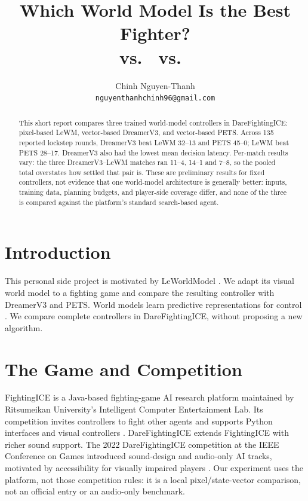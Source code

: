 \documentclass[10pt,twocolumn]{article}
\title{Which World Model Is the Best Fighter?\\
\lewm{} vs.\ \dreamer{} vs.\ \pets{}}
\author{Chinh Nguyen-Thanh\\
\texttt{nguyenthanhchinh96@gmail.com}}
\date{}
\newcommand{\system}{DareFightingICE}
\newcommand{\lewm}{LeWM}
\newcommand{\dreamer}{DreamerV3}
\newcommand{\pets}{PETS}
\begin{document}
\maketitle

\begin{abstract}
This short report compares three trained world-model controllers in
\system{}: pixel-based \lewm{}, vector-based \dreamer{}, and vector-based
\pets{}.  Across 135 reported lockstep rounds, \dreamer{} beat \lewm{} 32--13
and \pets{} 45--0; \lewm{} beat \pets{} 28--17.  \dreamer{} also had the
lowest mean decision latency.  Per-match results vary: the three
\dreamer{}--\lewm{} matches ran 11--4, 14--1 and 7--8, so the pooled total
overstates how settled that pair is.  These are preliminary results for fixed
controllers, not evidence that one world-model architecture is generally
better: inputs, training data, planning budgets, and player-side coverage
differ, and none of the three is compared against the platform's standard
search-based agent.
\end{abstract}

\section{Introduction}

This personal side project is motivated by LeWorldModel
\cite{maes2026lewm}.  We adapt its visual world model to a fighting game
and compare the resulting controller with \dreamer{} and \pets{}.
World models learn predictive representations for control
\cite{ha2018worldmodels}.  We compare complete controllers in \system{},
without proposing a new algorithm.

\section{The Game and Competition}

FightingICE is a Java-based fighting-game AI research platform maintained
by Ritsumeikan University's Intelligent Computer Entertainment Lab.
Its competition invites controllers to fight other agents and supports
Python interfaces and visual controllers \cite{fightingicePlatform}.
\system{} extends FightingICE with richer sound support.  The 2022
\system{} competition at the IEEE Conference on Games introduced sound-design
and audio-only AI tracks, motivated by accessibility for visually impaired
players \cite{khan2022darefightingice}.  Our experiment uses the platform,
not those competition rules: it is a local pixel/state-vector comparison,
not an official entry or an audio-only benchmark.
\end{document}
